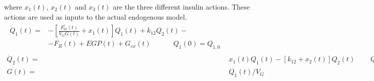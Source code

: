 where $x_1(t)$, $x_2(t)$ and $x_3(t)$ are the three different insulin actions. These actions are used as inputs to the actual endogenous model.
\begin{align} 
\begin{split} \label{eq:hovorka4}	\dot{Q}_{1}(t)= & -\left[\frac{F_{01}^{c}(t)}{V_{G}G(t)}+x_{1}(t)\right]Q_{1}(t)+k_{12}Q_{2}(t)- \\	& -F_{R}(t)+EGP(t)+G_{ex}(t) \quad \quad \quad \, Q_{1}(0)=Q_{1,0} \end{split} \\
  \dot{Q}_{2}(t)= & x_{1}(t)Q_{1}(t)-[k_{12}+x_{2}(t)]Q_{2}(t) \quad \quad \, Q_{2}(0)=Q_{2,0} \label{eq:hovorka5} \\
  G(t)= & Q_{1}(t)/V_{G} \label{eq:hovorka6}
	\end{align}

